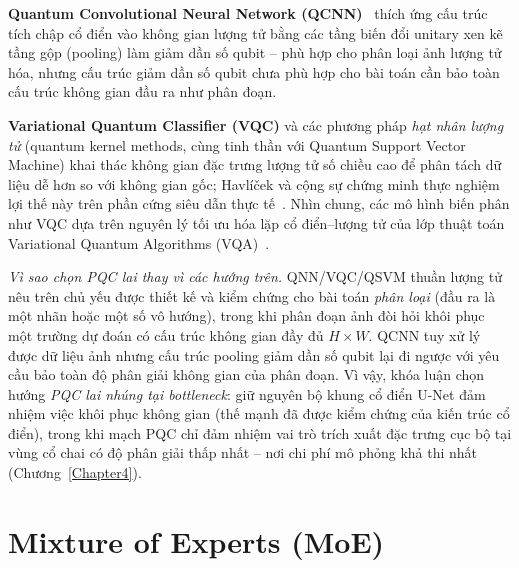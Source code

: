 \textbf{Quantum Convolutional Neural Network (QCNN)}~\cite{cong2019qcnn} thích ứng cấu trúc tích chập cổ điển vào không gian lượng tử bằng các tầng biến đổi unitary xen kẽ tầng gộp (pooling) làm giảm dần số qubit -- phù hợp cho phân loại ảnh lượng tử hóa, nhưng cấu trúc giảm dần số qubit chưa phù hợp cho bài toán cần bảo toàn cấu trúc không gian đầu ra như phân đoạn.

\textbf{Variational Quantum Classifier (VQC)} và các phương pháp \emph{hạt nhân lượng tử} (quantum kernel methods, cùng tinh thần với Quantum Support Vector Machine) khai thác không gian đặc trưng lượng tử số chiều cao để phân tách dữ liệu dễ hơn so với không gian gốc; Havlíček và cộng sự chứng minh thực nghiệm lợi thế này trên phần cứng siêu dẫn thực tế~\cite{havlicek2019supervised}. Nhìn chung, các mô hình biến phân như VQC dựa trên nguyên lý tối ưu hóa lặp cổ điển--lượng tử của lớp thuật toán Variational Quantum Algorithms (VQA)~\cite{cerezo2021vqa}.

\emph{Vì sao chọn PQC lai thay vì các hướng trên.} QNN/VQC/QSVM thuần lượng tử nêu trên chủ yếu được thiết kế và kiểm chứng cho bài toán \emph{phân loại} (đầu ra là một nhãn hoặc một số vô hướng), trong khi phân đoạn ảnh đòi hỏi khôi phục một trường dự đoán có cấu trúc không gian đầy đủ $H\times W$. QCNN tuy xử lý được dữ liệu ảnh nhưng cấu trúc pooling giảm dần số qubit lại đi ngược với yêu cầu bảo toàn độ phân giải không gian của phân đoạn. Vì vậy, khóa luận chọn hướng \emph{PQC lai nhúng tại bottleneck}: giữ nguyên bộ khung cổ điển U-Net đảm nhiệm việc khôi phục không gian (thế mạnh đã được kiểm chứng của kiến trúc cổ điển), trong khi mạch PQC chỉ đảm nhiệm vai trò trích xuất đặc trưng cục bộ tại vùng cổ chai có độ phân giải thấp nhất -- nơi chi phí mô phỏng khả thi nhất (Chương~\ref{Chapter4}).

\FloatBarrier

\section{Mixture of Experts (MoE)}
